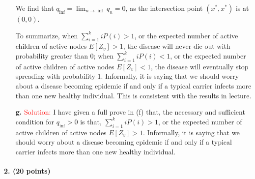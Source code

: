 \documentclass[11pt]{article} %
\begin{document}
\begin{itemize}
We find that $q_{\inf}=\lim_{n \to \inf} q_n =0$, as the intersection point $(x^*, x^*)$ is at $(0,0)$.

To summarize, when $\sum_{i=1}^{k} i P(i) >1$, or the expected number of active children of active nodes $E[Z_v]>1$, the disease will never die out with probability greater than 0; when $\sum_{i=1}^{k} i P(i) <1$, or the expected number of active children of active nodes $E[Z_v]<1$, the disease will eventually stop spreading with probability 1. Informally, it is saying that we should worry about a disease becoming epidemic if and only if a typical carrier infects more than one new healthy individual. This is consistent with the results in lecture.

		\item[\textbf{g.}]  
\textcolor{red}{Solution:}
I have given a full prove in (f) that, the necessary and sufficient condition for $q_{\inf}>0$ is that, $\sum_{i=1}^{k} i P(i) >1$, or the expected number of active children of active nodes $E[Z_v]>1$. Informally, it is saying that we should worry about a disease becoming epidemic if and only if a typical carrier infects more than one new healthy individual.


 \end{itemize}


















\paragraph{2. (20 points)}  
\end{document}
